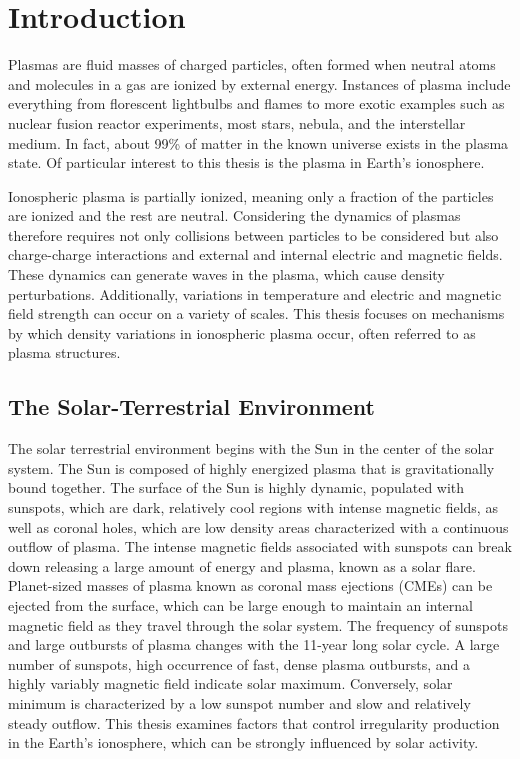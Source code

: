 
\chapter{Introduction}
\label{sec:introduction}

Plasmas are fluid masses of charged particles, often formed when neutral atoms and molecules in a gas are ionized by external energy.  Instances of plasma include everything from florescent lightbulbs and flames to more exotic examples such as nuclear fusion reactor experiments, most stars, nebula, and the interstellar medium.  In fact, about 99\% of matter in the known universe exists in the plasma state.  Of particular interest to this thesis is the plasma in Earth's ionosphere.

Ionospheric plasma is partially ionized, meaning only a fraction of the particles are ionized and the rest are neutral.  Considering the dynamics of plasmas therefore requires not only collisions between particles to be considered but also charge-charge interactions and external and internal electric and magnetic fields.  These dynamics can generate waves in the plasma, which cause density perturbations.  Additionally, variations in temperature and electric and magnetic field strength can occur on a variety of scales.  This thesis focuses on mechanisms by which density variations in ionospheric plasma occur, often referred to as plasma structures.

\section{The Solar-Terrestrial Environment}
The solar terrestrial environment begins with the Sun in the center of the solar system.  The Sun is composed of highly energized plasma that is gravitationally bound together.  The surface of the Sun is highly dynamic, populated with sunspots, which are dark, relatively cool regions with intense magnetic fields, as well as coronal holes, which are low density areas characterized with a continuous outflow of plasma.  The intense magnetic fields associated with sunspots can break down releasing a large amount of energy and plasma, known as a solar flare.  Planet-sized masses of plasma known as coronal mass ejections (CMEs) can be ejected from the surface, which can be large enough to maintain an internal magnetic field as they travel through the solar system.  The frequency of sunspots and large outbursts of plasma changes with the 11-year long solar cycle.  A large number of sunspots, high occurrence of fast, dense plasma outbursts, and a highly variably magnetic field indicate solar maximum.  Conversely, solar minimum is characterized by a low sunspot number and slow and relatively steady outflow.  This thesis examines factors that control irregularity production in the Earth's ionosphere, which can be strongly influenced by solar activity.

